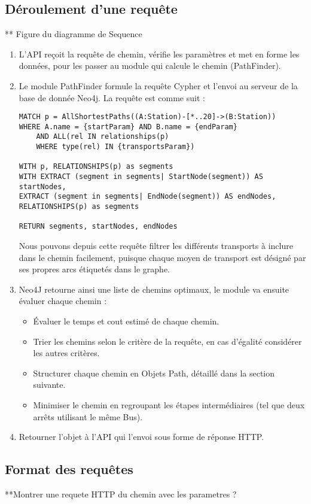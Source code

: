 	\subsection{Déroulement d'une requête}
		** Figure du diagramme de Sequence
		\begin{enumerate}
		\item L'API reçoit la requête de chemin, vérifie les paramètres et met en forme les données, pour les passer au module qui calcule le chemin (PathFinder).
		\item Le module PathFinder formule la requête Cypher et l'envoi au serveur de la base de donnée Neo4j.
		La requête est comme suit : 		
\begin{lstlisting}[style=cypher, caption=Requête Cypher des plus courts chemins]
MATCH p = AllShortestPaths((A:Station)-[*..20]->(B:Station))
WHERE A.name = {startParam} AND B.name = {endParam}
	AND ALL(rel IN relationships(p) 
	WHERE type(rel) IN {transportsParam})

WITH p, RELATIONSHIPS(p) as segments
WITH EXTRACT (segment in segments| StartNode(segment)) AS startNodes,
EXTRACT (segment in segments| EndNode(segment)) AS endNodes,
RELATIONSHIPS(p) as segments
            
RETURN segments, startNodes, endNodes
\end{lstlisting}
			Nous pouvons depuis cette requête filtrer les différents transports à inclure dans le chemin facilement, puisque chaque moyen de transport est désigné par ses propres arcs étiquetés dans le graphe.
		\item Neo4J retourne ainsi une liste de chemins optimaux, le module va ensuite évaluer chaque chemin :
			\begin{itemize}
			\item Évaluer le temps et cout estimé de chaque chemin.
			\item Trier les chemins selon le critère de la requête, en cas d'égalité considérer les autres critères.
			\item Structurer chaque chemin en Objets Path, détaillé dans la section suivante.
			\item Minimiser le chemin en regroupant les étapes intermédiaires (tel que deux arrêts utilisant le même Bus).
			\end{itemize}
		\item Retourner l'objet à l'API qui l'envoi sous forme de réponse HTTP.
		\end{enumerate}
\label{SectionPathFinding}
	
	\subsection{Format des requêtes}
	**Montrer une requete HTTP du chemin avec les parametres ? 
